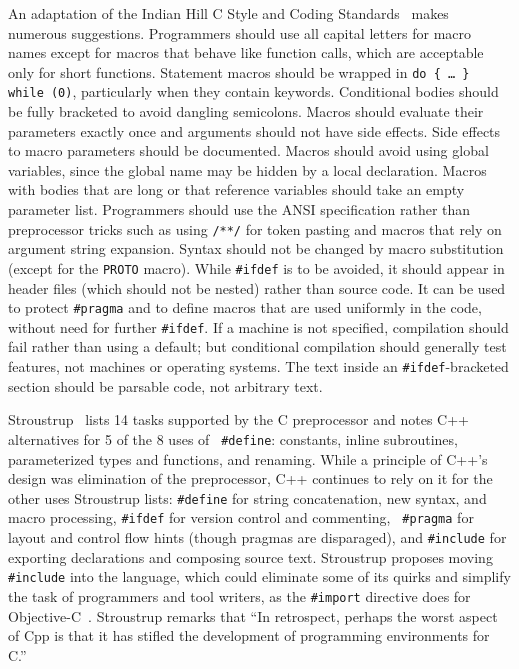 \documentclass[10pt]{article}
\begin{document}
An adaptation of the Indian Hill C Style and Coding
Standards~\cite{Cannon90} makes numerous suggestions. Programmers should use all capital letters for macro
names except for macros that behave like function calls, which are
acceptable only for short functions.  Statement macros should be wrapped in
{\tt do \{ \ldots{} \} while (0)}, particularly when they contain keywords.
Conditional bodies should be fully bracketed to avoid dangling semicolons.
Macros should evaluate their parameters exactly once and arguments should
not have side effects.  Side effects to macro parameters should be
documented.  Macros should avoid using global variables, since the global name may
be hidden by a local declaration.  Macros with bodies that are long or
that reference variables should take an empty parameter list.  Programmers
should use the ANSI specification rather than preprocessor tricks such as
using {\tt /**/} for token pasting and macros that rely on argument string
expansion.  Syntax should not be changed by macro substitution (except for
the {\tt PROTO} macro).  While {\tt \#ifdef} is to be avoided, it should
appear in header files (which should not be nested) rather than source
code.  It can be used to protect {\tt \#pragma} and to define macros that
are used uniformly in the code, without need for further {\tt \#ifdef}.  If
a machine is not specified, compilation should fail rather than using a
default; but conditional compilation should generally test features, not
machines or operating systems.  The text inside an {\tt \#ifdef}-bracketed section
should be parsable code, not arbitrary text.

Stroustrup~\cite{Stroustrup-DesignEvolution} lists 14 tasks supported by
the C preprocessor and notes C++ alternatives for 5 of the 8 uses of {\tt
\#define}:  constants, inline subroutines, parameterized types and
functions, and renaming.  While a principle of C++'s design was elimination
of the preprocessor, C++ continues to rely on it for the other uses
Stroustrup lists:  {\tt \#define} for string concatenation, new syntax, and
macro processing, {\tt \#ifdef} for version control and commenting, {\tt
\#pragma} for layout and control flow hints (though pragmas are
disparaged), and {\tt \#include} for exporting declarations and composing
source text.  Stroustrup proposes moving {\tt \#include} into the language,
which could eliminate some of its quirks and simplify the task of
programmers and tool writers, as the {\tt \#import} directive does for
Objective-C~\cite{CoxN91}.  Stroustrup remarks that ``In retrospect,
perhaps the worst aspect of Cpp is that it has stifled the development of
programming environments for C.''
\end{document}
